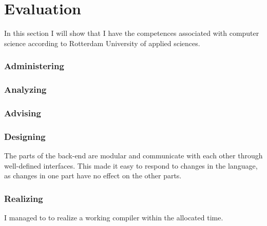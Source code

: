 \section{Evaluation}\label{evaluation}
In this section I will show that I have the competences associated with computer science according to Rotterdam University of applied sciences.

\subsubsection{Administering}


\subsubsection{Analyzing}

\subsubsection{Advising}


\subsubsection{Designing}
The parts of the back-end are modular and communicate with each other through well-defined interfaces.
This made it easy to respond to changes in the language, as changes in one part have no effect on the other parts.

\subsubsection{Realizing}
I managed to to realize a working compiler within the allocated time.
